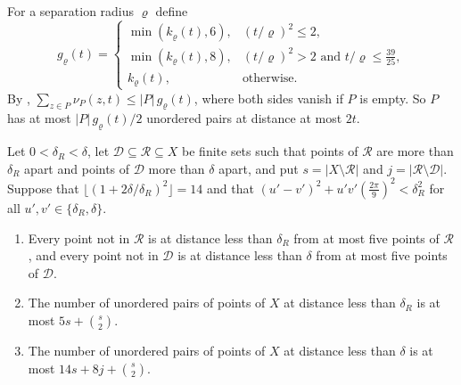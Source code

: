 \documentclass[11pt,colorlinks]{charlie}
\newcommand{\cR}{\mathcal{R}}
\newcommand{\cD}{\mathcal{D}}
\begin{document}
For a separation radius $\varrho$ define
\[
 g_\varrho(t)=\begin{cases}\min(k_\varrho(t),6),&(t/\varrho)^2\le2,\\ \min(k_\varrho(t),8),&(t/\varrho)^2>2\text{ and }t/\varrho\le\tfrac{39}{25},\\ k_\varrho(t),&\text{otherwise.}\end{cases}
\]
By , $\sum_{z\in P}\nu_P(z,t)\le|P|\,g_\varrho(t)$, where both sides vanish if $P$ is empty. So $P$ has at most $|P|\,g_\varrho(t)/2$ unordered pairs at distance at most $2t$.

\begin{lemma}\label{lem:shortpairs}
Let $0<\delta_R<\delta$, let $\cD\subseteq\cR\subseteq X$ be finite sets such that points of $\cR$ are more than $\delta_R$ apart and points of $\cD$ more than $\delta$ apart, and put $s=|X\setminus\cR|$ and $j=|\cR\setminus\cD|$. Suppose that $\lfloor(1+2\delta/\delta_R)^2\rfloor=14$ and that $(u'-v')^2+u'v'(\tfrac{2\pi}9)^2<\delta_R^2$ for all $u',v'\in\{\delta_R,\delta\}$.
\begin{enumerate}
\item Every point not in $\cR$ is at distance less than $\delta_R$ from at most five points of $\cR$, and every point not in $\cD$ is at distance less than $\delta$ from at most five points of $\cD$.
\item The number of unordered pairs of points of $X$ at distance less than $\delta_R$ is at most $5s+\binom s2$.
\item The number of unordered pairs of points of $X$ at distance less than $\delta$ is at most $14s+8j+\binom s2$.
\end{enumerate}
\end{lemma}
\end{document}
